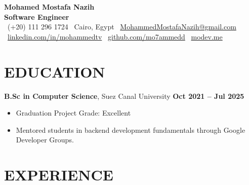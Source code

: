 \documentclass[letterpaper, 11pt]{article}
\begin{document}
\begin{center}
    {\LARGE \textbf{Mohamed Mostafa Nazih}}\\[0.15em]
    \textbf{Software Engineer} \\[0.15em]
    \faPhone~(+20) 111 296 1724 \quad
    \faMapMarker~Cairo, Egypt \quad
    \faEnvelope~\href{mailto:MohammedMostafaNazih@gmail.com}{MohammedMostafaNazih@gmail.com} \\[0.15em]
    {\small
    \faLinkedin~\href{http://linkedin.com/in/mohammedtv}{linkedin.com/in/mohammedtv} \quad
    \faGithub~\href{https://github.com/mo7ammedd}{github.com/mo7ammedd} \quad
    \faGlobe~\href{https://modev.me/}{modev.me}
    }
\end{center}



\section{EDUCATION}
\vspace{0.5em}
\textbf{B.Sc in Computer Science}, Suez Canal University \hfill \textbf{Oct 2021 -- Jul 2025} \\
\vspace{-1em}
\begin{itemize}[leftmargin=1.5em, nosep, itemsep=0.1em]
  \item Graduation Project Grade: Excellent
  \item Mentored students in backend development fundamentals through Google Developer Groups.
\end{itemize}


\section{EXPERIENCE}
\vspace{0.5em}
\end{document}

